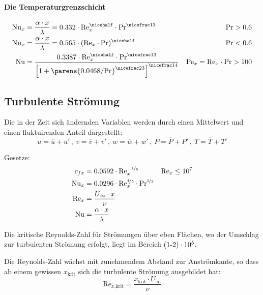 		\paragraph{Die Temperaturgrenzschicht} %
			\begin{align*}
				\mathrm{Nu}_x &= \frac{\alpha \cdot x}{\lambda} = 0.332 \cdot \mathrm{Re}_x^{\nicehalf} \cdot \mathrm{Pr}^{\nicefrac 1 3} & \mathrm{Pr} > 0.6 \\
				\mathrm{Nu}_x &= \frac{\alpha \cdot x}{\lambda} = 0.565 \cdot (\mathrm{Re}_x\vphantom{1^2} \cdot \mathrm{Pr})^{\nicehalf} & \mathrm{Pr} < 0.6 \\
				\mathrm{Nu} &= \frac{0.3387 \cdot \mathrm{Re}_x^{\nicehalf} \cdot \mathrm{Pr}^{\nicefrac 1 3}}{\left[
					1 + \parens{
						0.0468 / \mathrm{Pr}
					}^{\nicefrac 2 3}
				\right]^{\nicefrac 1 4}} & \mathrm{Pe}_x = \mathrm{Re}_x \cdot \mathrm{Pr} > 100
			\end{align*}



	\subsection{Turbulente Strömung} %
		Die in der Zeit sich ändernden Variablen werden durch einen Mittelwert und einen fluktuirenden Anteil dargestellt:
		\[
			u = \overline u + u'\,,\ v = \overline v + v'\,,\ w = \overline w + w'\,,\ P = \overline P + P'\,,\ T = \overline T + T'
		\]

		Gesetze:
		\begin{align*}
			c_{fx} &= 0.0592 \cdot \mathrm{Re}_x^{-\nicefrac 1 5} & \mathrm{Re}_x \le 10^7 \\
			\mathrm{Nu}_x &= 0.0296 \cdot \mathrm{Re}_x^{\nicefrac 4 5} \cdot \mathrm{Pr}^{\nicefrac 1 3} \\
			\mathrm{Re}_x &= \frac{U_\infty \cdot x}{\nu} \\
			\mathrm{Nu} &= \frac{\alpha \cdot x}{\lambda}
		\end{align*}

		Die kritische Reynolds-Zahl für Strömungen über eben Flächen, wo der Umschlag zur turbulenten Strömung erfolgt, liegt im Bereich $(1\text-2)\cdot 10^5$.

		Die Reynolds-Zahl wächst mit zunehmendem Abstand zur Anströmkante, so dass ab einem gewissen $x_\text{krit}$ sich die turbulente Strömung ausgebildet hat:
		\[
			\mathrm{Re}_{x\text{,krit}} = \frac{x_\text{krit} \cdot U_\infty}{\nu}
		\]

